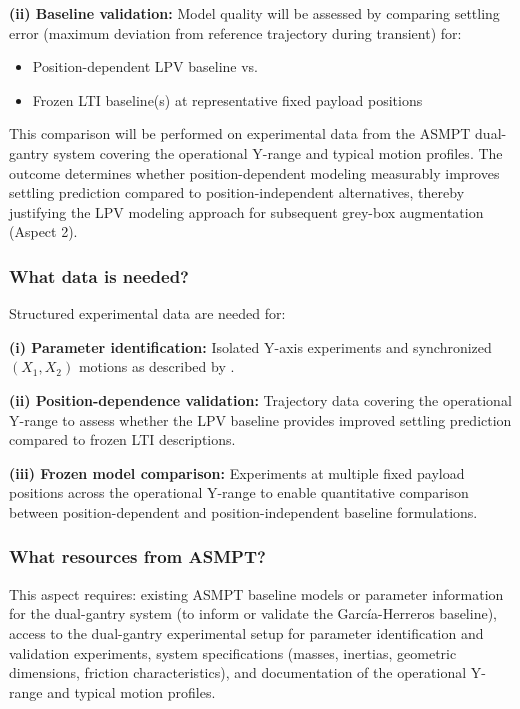 \textbf{(ii) Baseline validation:}  
Model quality will be assessed by comparing settling error (maximum deviation from reference trajectory during transient) for:
\begin{itemize}
    \item Position-dependent LPV baseline vs.
    \item Frozen LTI baseline(s) at representative fixed payload positions
\end{itemize}

This comparison will be performed on experimental data from the ASMPT dual-gantry system covering the operational Y-range and typical motion profiles. The outcome determines whether position-dependent modeling measurably improves settling prediction compared to position-independent alternatives, thereby justifying the LPV modeling approach for subsequent grey-box augmentation (Aspect 2).

\subsubsection{What data is needed?}

Structured experimental data are needed for:

\textbf{(i) Parameter identification:} Isolated Y-axis experiments and synchronized $(X_1,X_2)$ motions as described by \citet{garcia2013model}.

\textbf{(ii) Position-dependence validation:} Trajectory data covering the operational Y-range to assess whether the LPV baseline provides improved settling prediction compared to frozen LTI descriptions.

\textbf{(iii) Frozen model comparison:} Experiments at multiple fixed payload positions across the operational Y-range to enable quantitative comparison between position-dependent and position-independent baseline formulations.

\subsubsection{What resources from ASMPT?}

This aspect requires: existing ASMPT baseline models or parameter information for the dual-gantry system (to inform or validate the García-Herreros baseline), access to the dual-gantry experimental setup for parameter identification and validation experiments, system specifications (masses, inertias, geometric dimensions, friction characteristics), and documentation of the operational Y-range and typical motion profiles.



